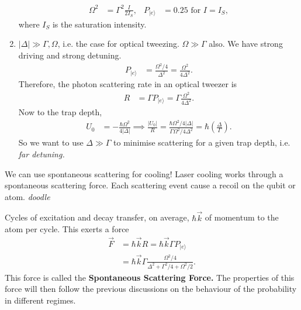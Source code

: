 \documentclass[lasers.tex]{subfiles}
\begin{document}
\begin{enumerate}
        \begin{align}
            \Omega^2 &= \Gamma^2\frac{I}{2I_S}, & P_{|e\rangle} &= 0.25 \text{ for } I=I_S,
        \end{align}
        where $I_S$ is the saturation intensity. 
    \item $|\Delta|\gg\Gamma,\Omega$, i.e. the case for optical tweezing.
        $\Omega\gg\Gamma$ also.
        We have strong driving and strong detuning.
        \begin{align}
            P_{|e\rangle} &= \frac{\Omega^2/4}{\Delta^2} = \frac{\Omega^2}{4\Delta^2}.
        \end{align}
        Therefore, the photon scattering rate in an optical tweezer is
        \begin{align}
            R &= \Gamma P_{|e\rangle} = \Gamma\frac{\Omega^2}{4\Delta^2}.
        \end{align}
        Now to the trap depth, 
        \begin{align}
            U_0 &= -\frac{\hbar\Omega^2}{4|\Delta|} \implies \frac{|U_0|}{R} = \frac{\hbar\Omega^2/4|\Delta|}{\Gamma\Omega^2/4\Delta^2} = \hbar\left(\frac{\Delta}{\Gamma}\right).
        \end{align}
        So we want to use $\Delta\gg\Gamma$ to minimise scattering for a given trap depth, i.e. \emph{far detuning.}
\end{enumerate}
We can use spontaneous scattering for cooling!
Laser cooling works through a spontaneous scattering force.
Each scattering event cause a recoil on the qubit or atom.
\emph{doodle}
\begin{figure}[H]
    \centering
\end{figure}
Cycles of excitation and decay transfer, on average, $\hbar\vec{k}$ of momentum to the atom per cycle.
This exerts a force
\begin{align}
    \vec{F} &= \hbar\vec{k}R = \hbar\vec{k}\Gamma P_{|e\rangle} \\
            &= \hbar\vec{k}\Gamma\frac{\Omega^2/4}{\Delta^2+\Gamma^2/4+\Omega^2/2}.
\end{align}
This force is called the \textbf{Spontaneous Scattering Force.}
The properties of this force will then follow the previous discussions on the behaviour of the probability in different regimes.
\end{document}
